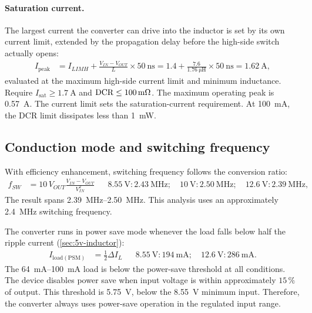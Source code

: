 \paragraph{Saturation current.} The largest current the converter can drive into
the inductor is set by its own current limit, extended by the propagation delay
before the high-side switch actually opens:
\begin{align*}
  I_{\mathrm{peak}} &= I_{LIMH} + \frac{V_{IN}-V_{OUT}}{L}\times\SI{50}{\nano\second}
    = 1.4 + \frac{7.6}{\SI{1.76}{\micro\henry}}\times\SI{50}{\nano\second}
    = \SI{1.62}{\ampere},
\end{align*}
evaluated at the maximum high-side current limit and minimum inductance. Require
$I_{\mathrm{sat}}\geq\SI{1.7}{\ampere}$ and
${\rm DCR}\leq\SI{100}{\milli\ohm}$. The maximum operating peak is
\SI{0.57}{\ampere}. The current limit sets the saturation-current requirement.
At \SI{100}{\milli\ampere}, the DCR limit dissipates less than
\SI{1}{\milli\watt}.

\subsection{Conduction mode and switching frequency}\label{sec:5v-op}

With efficiency enhancement, switching frequency follows the conversion ratio:
\begin{align*}
  f_{SW} &= 10\,V_{OUT}\frac{V_{IN}-V_{OUT}}{V_{IN}^2}
  &&\SI{8.55}{\volt}: \SI{2.43}{\mega\hertz}; \quad
    \SI{10}{\volt}: \SI{2.50}{\mega\hertz}; \quad
    \SI{12.6}{\volt}: \SI{2.39}{\mega\hertz},
\end{align*}
The result spans \SIrange{2.39}{2.50}{\mega\hertz}. This analysis uses an
approximately \SI{2.4}{\mega\hertz} switching frequency.

The converter runs in power save mode whenever the load falls below half the
ripple current (\cref{sec:5v-inductor}):
\begin{align*}
  I_{\mathrm{load(PSM)}} &= \tfrac{1}{2}\Delta I_L
  &&\SI{8.55}{\volt}: \SI{194}{\milli\ampere}; \quad
    \SI{12.6}{\volt}: \SI{286}{\milli\ampere}.
\end{align*}
The \SIrange{64}{100}{\milli\ampere} load is below the power-save threshold at
all conditions. The device disables power save when input voltage is within
approximately $15\,\%$ of output. This threshold is \SI{5.75}{\volt}, below the
\SI{8.55}{\volt} minimum input. Therefore, the converter always uses power-save
operation in the regulated input range.

